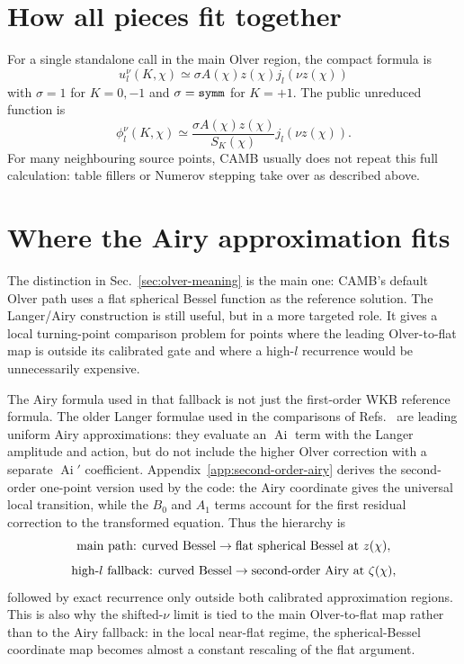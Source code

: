 \documentclass[11pt,a4paper]{article}
\newcommand{\code}[1]{\texttt{\detokenize{#1}}}
\newcommand{\SK}{S_K}
\newcommand{\Ai}{\operatorname{Ai}}
\begin{document}
\section{How all pieces fit together}

For a single standalone call in the main Olver region, the compact formula is
\begin{equation}
  \boxed{
  u_l^\nu(K,\chi)\simeq \sigma A(\chi)z(\chi)j_l(\nu z(\chi))
  }
\end{equation}
with \(\sigma=1\) for \(K=0,-1\) and \(\sigma=\code{symm}\) for \(K=+1\).  The public unreduced function is
\begin{equation}
  \boxed{
  \phi_l^\nu(K,\chi)\simeq
  \frac{\sigma A(\chi)z(\chi)}{\SK(\chi)}j_l(\nu z(\chi)).
  }
\end{equation}
For many neighbouring source points, CAMB usually does not repeat this full calculation: table fillers or Numerov stepping take over as described above.

\section{Where the Airy approximation fits}

The distinction in Sec.~\ref{sec:olver-meaning} is the main one: CAMB's
default Olver path uses a flat spherical Bessel function as the reference
solution.  The Langer/Airy construction is still useful, but in a more targeted
role.  It gives a local turning-point comparison problem for points where the
leading Olver-to-flat map is outside its calibrated gate and where a high-\(l\)
recurrence would be unnecessarily expensive.

The Airy formula used in that fallback is not just the first-order WKB
reference formula.  The older Langer formulae used in the comparisons of
Refs.~\cite{kosowsky1998,tram2013,lesgourgues-tram2013} are leading uniform
Airy approximations: they evaluate an \(\Ai\) term with the Langer amplitude
and action, but do not include the higher Olver correction with a separate
\(\Ai'\) coefficient.  Appendix~\ref{app:second-order-airy} derives the
second-order one-point version used by the code: the Airy coordinate gives the
universal local transition, while the \(B_0\) and \(A_1\) terms account for the
first residual correction to the transformed equation.  Thus the hierarchy is
\[
  \hbox{main path: curved Bessel}\to
  \hbox{flat spherical Bessel at }z(\chi),
\]
\[
  \hbox{high-}l\hbox{ fallback: curved Bessel}\to
  \hbox{second-order Airy at }\zeta(\chi),
\]
followed by exact recurrence only outside both calibrated approximation
regions.  This is also why the shifted-\(\nu\) limit is tied to the main
Olver-to-flat map rather than to the Airy fallback: in the local near-flat
regime, the spherical-Bessel coordinate map becomes almost a constant
rescaling of the flat argument.
\end{document}
